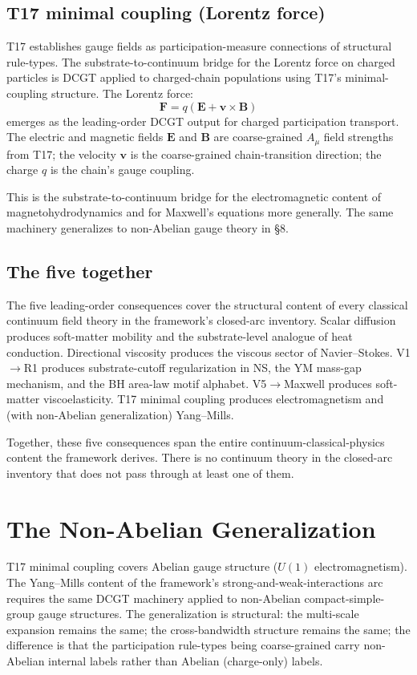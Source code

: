 \documentclass[11pt,a4paper]{article}
\begin{document}
\subsection{T17 minimal coupling (Lorentz force)}

T17 establishes gauge fields as participation-measure connections of structural rule-types. The substrate-to-continuum bridge for the Lorentz force on charged particles is DCGT applied to charged-chain populations using T17's minimal-coupling structure. The Lorentz force:
\[
\mathbf{F} = q(\mathbf{E} + \mathbf{v} \times \mathbf{B})
\]
emerges as the leading-order DCGT output for charged participation transport. The electric and magnetic fields $\mathbf{E}$ and $\mathbf{B}$ are coarse-grained $A_\mu$ field strengths from T17; the velocity $\mathbf{v}$ is the coarse-grained chain-transition direction; the charge $q$ is the chain's gauge coupling.

This is the substrate-to-continuum bridge for the electromagnetic content of magnetohydrodynamics and for Maxwell's equations more generally. The same machinery generalizes to non-Abelian gauge theory in \S8.

\subsection{The five together}

The five leading-order consequences cover the structural content of every classical continuum field theory in the framework's closed-arc inventory. Scalar diffusion produces soft-matter mobility and the substrate-level analogue of heat conduction. Directional viscosity produces the viscous sector of Navier--Stokes. V1$\to$R1 produces substrate-cutoff regularization in NS, the YM mass-gap mechanism, and the BH area-law motif alphabet. V5$\to$Maxwell produces soft-matter viscoelasticity. T17 minimal coupling produces electromagnetism and (with non-Abelian generalization) Yang--Mills.

Together, these five consequences span the entire continuum-classical-physics content the framework derives. There is no continuum theory in the closed-arc inventory that does not pass through at least one of them.

\section{The Non-Abelian Generalization}

T17 minimal coupling covers Abelian gauge structure ($U(1)$ electromagnetism). The Yang--Mills content of the framework's strong-and-weak-interactions arc requires the same DCGT machinery applied to non-Abelian compact-simple-group gauge structures. The generalization is structural: the multi-scale expansion remains the same; the cross-bandwidth structure remains the same; the difference is that the participation rule-types being coarse-grained carry non-Abelian internal labels rather than Abelian (charge-only) labels.
\end{document}
